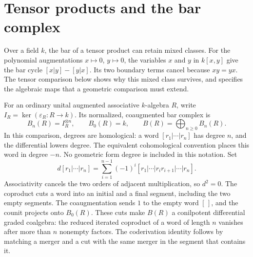 \section*{Tensor products and the bar complex}

Over a field $k$, the bar of a tensor product can retain mixed classes.
For the polynomial augmentations $x\mapsto0$, $y\mapsto0$, the
variables $x$ and $y$ in $k[x,y]$ give the
bar cycle $[x|y]-[y|x]$. Its two boundary terms cancel because
$xy=yx$. The tensor comparison below shows why this mixed class
survives, and specifies the algebraic maps that a geometric comparison
must extend.

For an ordinary unital augmented associative
$k$-algebra $R$, write $I_R=\ker(\varepsilon_R\colon R\to k)$.
Its normalized, coaugmented bar complex is
\[
 B_n(R)=I_R^{\otimes n},\qquad B_0(R)=k,\qquad
 B(R)=\bigoplus_{n\geq0}B_n(R).
\]
In this comparison, degrees are homological: a word
$[r_1|\cdots|r_n]$ has degree $n$, and the differential lowers degree.
The equivalent cohomological convention places this word in degree
$-n$. No geometric form degree is included in this notation. Set
\begin{equation}\label{eq:intro-ordinary-bar-differential}
 d[r_1|\cdots|r_n]
 =\sum_{i=1}^{n-1}(-1)^i
 [r_1|\cdots|r_ir_{i+1}|\cdots|r_n].
\end{equation}
Associativity cancels the two orders of adjacent multiplication, so
$d^2=0$. The coproduct cuts a word into an initial and a final segment,
including the two empty segments. The coaugmentation sends $1$ to the
empty word $[\,]$, and the counit projects onto $B_0(R)$.
These cuts make $B(R)$ a conilpotent differential graded coalgebra:
the reduced iterated coproduct of a word of length $n$ vanishes after
more than $n$ nonempty factors.
The coderivation identity follows by matching a merger and a cut
with the same merger in the segment that contains it.

